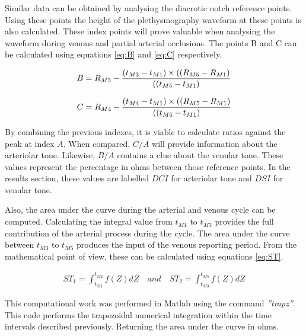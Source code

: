 Similar data can be obtained by analysing the diacrotic notch reference points. Using these points the height of the plethysmography waveform at these points is also calculated. These index points will prove valuable when analysing the waveform during venous and partial arterial occlusions. The points B and C can be calculated using equations \ref{eq:B} and \ref{eq:C} respectively.  

\begin{align}
	\label{eq:B}
	B = R_{M3} - \frac{(t_{M3}-t_{M1}) \times ((R_{M5}-R_{M1})}{((t_{M5}-t_{M1})} \tagaddtext{[\si{\ohm}]}
\end{align}

\begin{align}
	\label{eq:C}
	C = R_{M4} - \frac{(t_{M4}-t_{M1}) \times ((R_{M5}-R_{M1})}{((t_{M5}-t_{M1})} \tagaddtext{[\si{\ohm}]}
\end{align}

By combining the previous indexes, it is viable to calculate ratios against the peak at index $A$. When compared,  $C/A$ will provide information about the arteriolar tone. Likewise, $B/A$ contains a clue about the venular tone. These values represent the percentage in ohms between those reference points. In the results section, these values are labelled $DCI$ for arteriolar tone and $DSI$ for venular tone.


Also, the area under the curve during the arterial and venous cycle can be computed. Calculating the integral value from $t_{M1}$ to $t_{M3}$ provides the full contribution of the arterial process during the cycle. The area under the curve between $t_{M3}$ to $t_{M5}$ produces the input of the venous reporting period. From the mathematical point of view, these can be calculated using equations \ref{eq:ST}.

\begin{align}
	\label{eq:ST}
	ST_1 = \int_{t_{M1}}^{t_{M2}} f(Z) dZ \quad and \quad ST_2 = \int_{t_{M3}}^{t_{M5}} f(Z) dZ 
\end{align}

This computational work was performed in Matlab using the command \textit{''trapz''}. This code performs the trapezoidal numerical integration within the time intervals described previously. Returning the area under the curve in ohms.



